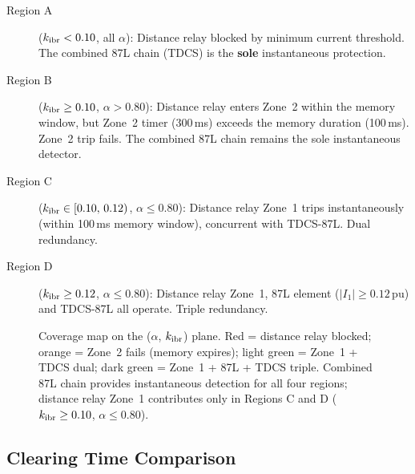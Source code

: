 \documentclass[11pt,a4paper]{article}
\begin{document}
\begin{description}
  \item[Region A] ($k_{\rm ibr} < 0.10$, all $\alpha$): Distance relay
    blocked by minimum current threshold.  The combined 87L chain (TDCS)
    is the \textbf{sole} instantaneous protection.

  \item[Region B] ($k_{\rm ibr} \geq 0.10$, $\alpha > 0.80$): Distance
    relay enters Zone~2 within the memory window, but Zone~2 timer
    (300\,ms) exceeds the memory duration (100\,ms).  Zone~2 trip fails.
    The combined 87L chain remains the sole instantaneous detector.

  \item[Region C] ($k_{\rm ibr} \in [0.10,\,0.12)$, $\alpha \leq 0.80$):
    Distance relay Zone~1 trips instantaneously (within 100\,ms memory
    window), concurrent with TDCS-87L.  Dual redundancy.

  \item[Region D] ($k_{\rm ibr} \geq 0.12$, $\alpha \leq 0.80$):
    Distance relay Zone~1, 87L element ($|I_1| \geq 0.12$\,pu) and
    TDCS-87L all operate.  Triple redundancy.
\end{description}

\begin{figure}[h!]
  \centering
  \resizebox{0.92\textwidth}{!}{}
  \caption{Coverage map on the ($\alpha$, $k_{\rm ibr}$) plane.
           Red = distance relay blocked; orange = Zone~2 fails (memory
           expires); light green = Zone~1 + TDCS dual; dark green =
           Zone~1 + 87L + TDCS triple.
           Combined 87L chain provides instantaneous detection for all
           four regions; distance relay Zone~1 contributes only in
           Regions C and D ($k_{\rm ibr} \geq 0.10$, $\alpha \leq 0.80$).}
  \label{fig:coverage}
\end{figure}

\subsection{Clearing Time Comparison}
\end{document}
